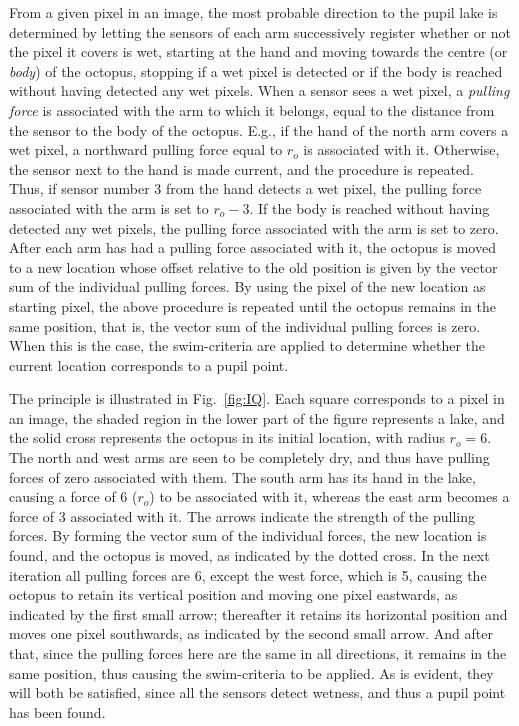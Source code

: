 From a given pixel in an image, the most probable direction to the
pupil lake is determined by letting the sensors of each arm
successively register whether or not the pixel it covers is wet,
starting at the hand and moving towards the centre (or {\em body\/})
of the octopus, stopping if a wet pixel is detected or if the body is
reached without having detected any wet pixels.  When a sensor sees a
wet pixel, a {\em pulling force\/} is associated with the arm to which
it belongs, equal to the distance from the sensor to the body of the
octopus.  E.g., if the hand of the north arm covers a wet pixel, a
northward pulling force equal to $r_{o}$ is associated with it.
Otherwise, the sensor next to the hand is made current, and the
procedure is repeated.  Thus, if sensor number 3 from the hand detects
a wet pixel, the pulling force associated with the arm is set to
$r_{o}-3$.  If the body is reached without having detected any wet
pixels, the pulling force associated with the arm is set to zero.
After each arm has had a pulling force associated with it, the octopus
is moved to a new location whose offset relative to the old position
is given by the vector sum of the individual pulling forces.  By using
the pixel of the new location as starting pixel, the above procedure
is repeated until the octopus remains in the same position, that is,
the vector sum of the individual pulling forces is zero.  When this is
the case, the swim-criteria are applied to determine whether the
current location corresponds to a pupil point.


The principle is illustrated in Fig.~\ref{fig:IQ}.  Each square
corresponds to a pixel in an image, the shaded region in the lower
part of the figure represents a lake, and the solid cross represents
the octopus in its initial location, with radius $r_{o}=6$.  The north
and west arms are seen to be completely dry, and thus have pulling
forces of zero associated with them.  The south arm has its hand in
the lake, causing a force of 6 ($r_{o}$) to be associated with it,
whereas the east arm becomes a force of 3 associated with it.  The
arrows indicate the strength of the pulling forces.  By forming the
vector sum of the individual forces, the new location is found, and
the octopus is moved, as indicated by the dotted cross.  In the next
iteration all pulling forces are 6, except the west force, which is 5,
causing the octopus to retain its vertical position and moving one
pixel eastwards, as indicated by the first small arrow; thereafter it
retains its horizontal position and moves one pixel southwards, as
indicated by the second small arrow.  And after that, since the
pulling forces here are the same in all directions, it remains in the
same position, thus causing the swim-criteria to be applied.  As is
evident, they will both be satisfied, since all the sensors detect
wetness, and thus a pupil point has been found.


